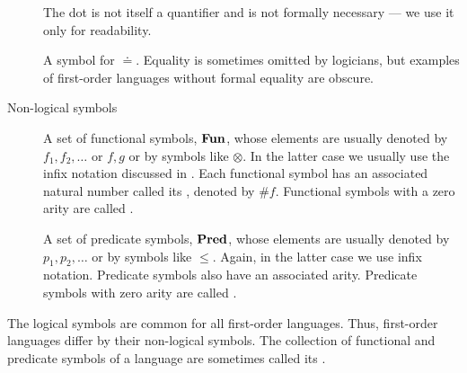 \begin{definition}
\begin{description}
\begin{thmenum}[series=def:first_order_language]
      The dot is not itself a quantifier and is not formally necessary --- we use it only for readability.

       A symbol for  \( \doteq \). Equality is sometimes omitted by logicians, but examples of first-order languages without formal equality are obscure.
    \end{thmenum}

    \item[Non-logical symbols]
    \hfill
    \begin{thmenum}[resume=def:first_order_language]
       A set of functional symbols, \( \operatorname{\mathbf{Fun}} \), whose elements are usually denoted by \( f_1, f_2, \ldots \) or \( f, g \) or by symbols like \( \otimes \). In the latter case we usually use the infix notation discussed in . Each functional symbol has an associated natural number called its , denoted by \( \# f \). Functional symbols with a zero arity are called .

       A set of predicate symbols, \( \operatorname{\mathbf{Pred}} \), whose elements are usually denoted by \( p_1, p_2, \ldots \) or by symbols like \( \leq \). Again, in the latter case we use infix notation. Predicate symbols also have an associated arity. Predicate symbols with zero arity are called .
    \end{thmenum}
  \end{description}

  The logical symbols are common for all first-order languages. Thus, first-order languages differ by their non-logical symbols. The collection of functional and predicate symbols of a language are sometimes called its .
\end{definition}

